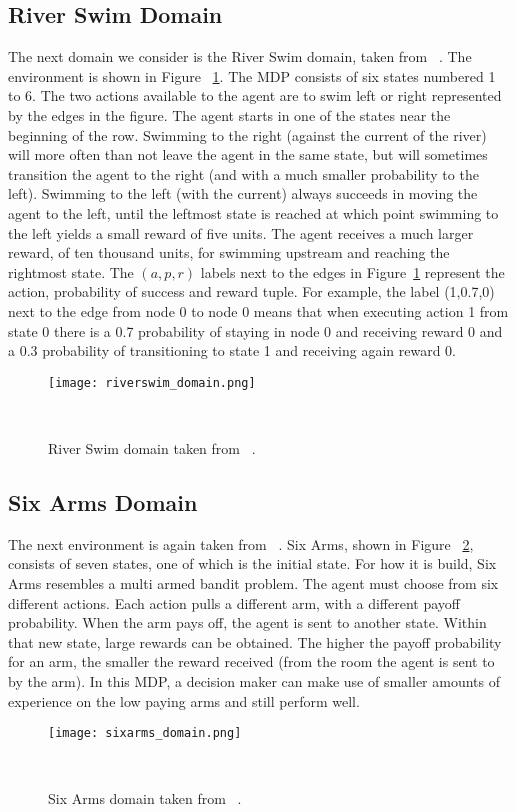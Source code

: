 \subsection{River Swim Domain }
The next domain we consider is the River Swim domain, taken from ~\cite{Strehl2008AnAO}. The environment is shown in Figure ~\ref{fig:riverswim_domain}. The MDP consists of six states numbered 1 to 6. The two actions available to the agent are to swim left or right represented by the edges in the figure. The agent starts in one of the states near the beginning of the row. Swimming to the right (against the current of the river) will more often than not leave the agent in the same state, but will sometimes transition the agent to the right (and with a much smaller probability to the left). Swimming to the left (with the current) always succeeds in moving the agent to the left, until the leftmost state is reached at which point swimming to the left yields a small reward of five units. The agent receives a much larger reward, of ten thousand units, for swimming upstream and reaching the rightmost state. The $(a,p,r)$ labels next to the edges in Figure~\ref{fig:riverswim_domain} represent the action, probability of success and reward tuple. For example, the label (1,0.7,0) next to the edge from node 0 to node 0 means that when executing action 1 from state 0 there is a 0.7 probability of staying in node 0 and receiving reward 0 and a 0.3 probability of transitioning to state 1 and receiving again reward 0.
\begin{figure}
 \texttt{[image: riverswim\_domain.png]}
 \caption{River Swim domain taken from ~\cite{Strehl2008AnAO}.} ~
 \label{fig:riverswim_domain}
\end{figure}
\subsection{Six Arms Domain}
The next environment is again taken from ~\cite{Strehl2008AnAO}. Six Arms, shown in Figure ~\ref{fig:sixarms_domain}, consists of seven states, one of which is the initial state. For how it is build, Six Arms resembles a multi armed bandit problem. The agent must choose from six different actions. Each action pulls a different arm, with a different payoff probability. When the arm pays off, the agent is sent to another state. Within that new state, large rewards can be obtained. The higher the payoff probability for an arm, the smaller the reward received (from the room the agent is sent to by the arm). In this MDP, a decision maker can make use of smaller amounts of experience on the low paying arms and still perform well.
\begin{figure}
 \texttt{[image: sixarms\_domain.png]}
 \caption{Six Arms domain taken from ~\cite{Strehl2008AnAO}.} ~
\label{fig:sixarms_domain}
\end{figure}
